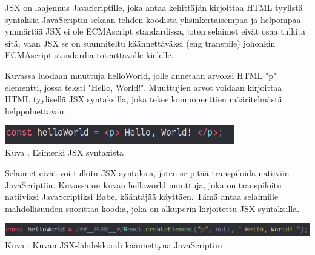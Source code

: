 






JSX on laajennus JavaScriptille, joka antaa kehittäjän kirjoittaa HTML tyylistä syntaksia JavaScriptin sekaan
tehden koodista yksinkertaisempaa ja helpompaa ymmärtää
JSX ei ole ECMAscript standardissa, joten selaimet eivät osaa tulkita sitä,
vaan JSX se on suunniteltu käännettäväksi (eng transpile) johonkin ECMAscript standardia toteuttavalle kielelle.
\medskip






Kuvassa \nextImageCount{} luodaan muuttuja helloWorld, jolle annetaan arvoksi HTML "p"{} elementti, jossa teksti "Hello, World!"{}.
Muuttujien arvot voidaan kirjoittaa HTML tyylisellä JSX syntaksilla, 
joka tekee komponenttien määritelmästä helppoluettavan.
\medskip



\bigskip
\includegraphics[width=10cm]{src/public/oppar/pure_jsx_example.png}\\
Kuva \getImgCount {}. Esimerki JSX syntaxista
\medskip




Selaimet eivät voi tulkita JSX syntaksia, joten se pitää transpiloida natiiviin JavaScriptiin.
Kuvassa \nextImageCount{} on kuvan \theimgCounter{} helloworld muuttuja, joka on transpiloitu natiiviksi JavaScriptiksi Babel kääntäjää käyttäen.
Tämä antaa selaimille mahdollisuuden suorittaa koodia, joka on alkuperin kirjoitettu JSX syntaksilla.
\medskip


\bigskip
\includegraphics[width=15cm]{src/public/oppar/transpiled_jsx_example.png}\\
Kuva \getImgCount {}. Kuvan \prevImageCount{} JSX-lähdekkoodi käännettynä JavaScriptiin
\medskip





